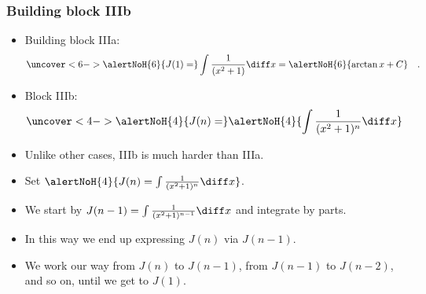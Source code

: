 \begin{frame}
\frametitle{Building block IIIb}
\begin{itemize}
\item<1-> Building block IIIa:
\[
\uncover<6->{\alertNoH{6}{J(1)=}} \int \frac{1}{(x^2+1)}\diff x=\alertNoH{6}{\arctan x+C}\quad .
\]
\item<2-> Block IIIb:
\[
\uncover<4->{\alertNoH{4}{J(n)=}} \alertNoH{4}{\int \frac{1}{(x^2+1)^n}\diff x}
\]
\item<3-> Unlike other cases, IIIb is much harder than IIIa.
\item<4-> Set $\alertNoH{4}{J(n)=\int \frac{1}{(x^2+1)^n}\diff x}$.  
\item<7-> We start by $J(n-1) =\int \frac{1}{(x^2+1)^{n-1}} \diff x$ and integrate by parts.
\item<8-> In this way we end up expressing $J(n)$ via $J(n-1)$.
\item<9-> We work our way from $J(n)$ to $J(n-1)$, from $J(n-1)$ to $J(n-2)$, and so on, until we get to $J(1)$.
\end{itemize}
\end{frame}

